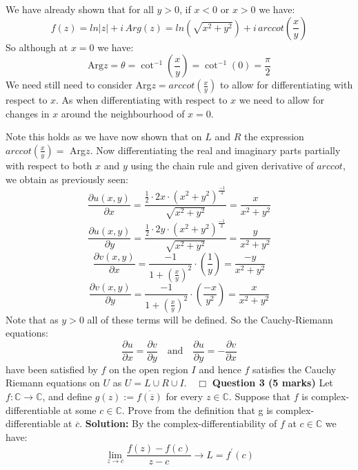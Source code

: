 \documentclass[12pt]{article}
\begin{document}
\noindent We have already shown that for all \(y > 0\), if \(x<0\) or \(x>0\) we have:
\[
    f(z) = ln|z| + i\,Arg\left(z\right) = ln\left(\sqrt{x^2 + y^2}\right) + i\,arccot\left(\frac{x}{y}\right)
\]
\noindent So although at \(x=0\) we have:
\[
\text{Arg}z = \theta = \cot^{-1} \left(\frac{x}{y}\right) = \cot^{-1}\left(0\right) = \frac{\pi}{2}
\]
\noindent We need still need to consider Arg\(z = arccot\left(\frac{x}{y}\right)\) to allow for differentiating with respect to \(x\). As when differentiating with respect to \(x\) we need to allow for changes in \(x\) around the neighbourhood of \(x=0\).\newline
\linebreak

\noindent Note this holds as we have now shown that on \(L\) and \(R\) the expression \(arccot\left(\frac{x}{y}\right) = \) Arg\(z\).\newline
\linebreak
\noindent Now differentiating the real and imaginary parts partially with respect to both \(x\) and \(y\) using the chain rule and given derivative of \(arccot\), we obtain as previously seen:
\[
\frac{\partial u(x,y)}{\partial x} = \frac{\frac{1}{2} \cdot 2x\cdot \left(x^2+y^2\right)^{\frac{-1}{2}}}{\sqrt{x^2+y^2}} = \frac{x}{x^2+y^2}
\]
\[
\frac{\partial u(x,y)}{\partial y} = \frac{\frac{1}{2} \cdot 2y\cdot \left(x^2+y^2\right)^{\frac{-1}{2}}}{\sqrt{x^2+y^2}} = \frac{y}{x^2+y^2}
\]
\[
\frac{\partial v(x,y)}{\partial x} = \frac{-1}{1 + \left(\frac{x}{y}\right)^2}\cdot \left(\frac{1}{y}\right) = \frac{-y}{x^2+y^2}
\]
\[
\frac{\partial v(x,y)}{\partial y} = \frac{-1}{1 + \left(\frac{x}{y}\right)^2}\cdot \left(\frac{-x}{y^2}\right) = \frac{x}{x^2+y^2}
\]
\noindent Note that as \(y>0\) all of these terms will be defined.\newline
\linebreak
\noindent So the Cauchy-Riemann equations:
\[
\frac{\partial u}{\partial x} = \frac{\partial v}{\partial y} \quad \text{and} \quad \frac{\partial u}{\partial y} = -\frac{\partial v}{\partial x}
\]
have been satisfied by \(f\) on the open region \(I\) and hence \(f\) satisfies the Cauchy Riemann equations on \(U\) as \(U = L \cup R \cup I.
 \quad \Box\) \newline
\linebreak
 \noindent \textbf{Question 3 (5 marks)} Let \(f : \mathbb{C} \to \mathbb{C}\), and define \(g(z) := \overline{f(\overline{z})}\) for every \(z \in \mathbb{C}\). Suppose that \(f\) is complex-differentiable at some \(c \in \mathbb{C}\). Prove from the definition that g is complex-differentiable at \(\overline{c}\).\newline
\linebreak
\textbf{Solution:} \newline 
\linebreak
By the complex-differentiability of \(f\) at \(c \in \mathbb{C}\) we have:
\[
\lim_{z \to c} \frac{f(z)-f(c)}{z-c} \to L = f^{\prime}(c)
\]
\end{document}
